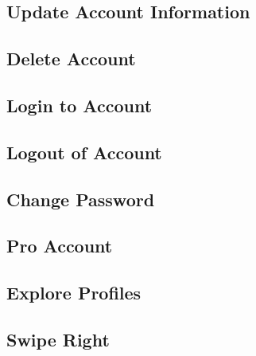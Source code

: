 \documentclass[10pt, draft]{article}
\begin{document}
\subsection{Update Account Information}
\subsection{Delete Account}
\subsection{Login to Account}
\subsection{Logout of Account}
\subsection{Change Password}
\subsection{Pro Account}
\subsection{Explore Profiles}
\subsection{Swipe Right}
\end{document}
